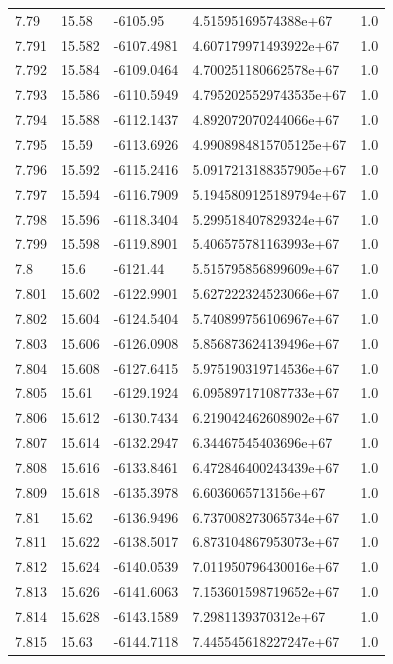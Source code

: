 \begin{tabular}{lllll}
7.79 & 15.58 & -6105.95 & 4.51595169574388e+67 & 1.0 \\
7.791 & 15.582 & -6107.4981 & 4.607179971493922e+67 & 1.0 \\
7.792 & 15.584 & -6109.0464 & 4.700251180662578e+67 & 1.0 \\
7.793 & 15.586 & -6110.5949 & 4.7952025529743535e+67 & 1.0 \\
7.794 & 15.588 & -6112.1437 & 4.892072070244066e+67 & 1.0 \\
7.795 & 15.59 & -6113.6926 & 4.9908984815705125e+67 & 1.0 \\
7.796 & 15.592 & -6115.2416 & 5.0917213188357905e+67 & 1.0 \\
7.797 & 15.594 & -6116.7909 & 5.1945809125189794e+67 & 1.0 \\
7.798 & 15.596 & -6118.3404 & 5.299518407829324e+67 & 1.0 \\
7.799 & 15.598 & -6119.8901 & 5.406575781163993e+67 & 1.0 \\
7.8 & 15.6 & -6121.44 & 5.515795856899609e+67 & 1.0 \\
7.801 & 15.602 & -6122.9901 & 5.627222324523066e+67 & 1.0 \\
7.802 & 15.604 & -6124.5404 & 5.740899756106967e+67 & 1.0 \\
7.803 & 15.606 & -6126.0908 & 5.856873624139496e+67 & 1.0 \\
7.804 & 15.608 & -6127.6415 & 5.975190319714536e+67 & 1.0 \\
7.805 & 15.61 & -6129.1924 & 6.095897171087733e+67 & 1.0 \\
7.806 & 15.612 & -6130.7434 & 6.219042462608902e+67 & 1.0 \\
7.807 & 15.614 & -6132.2947 & 6.34467545403696e+67 & 1.0 \\
7.808 & 15.616 & -6133.8461 & 6.472846400243439e+67 & 1.0 \\
7.809 & 15.618 & -6135.3978 & 6.6036065713156e+67 & 1.0 \\
7.81 & 15.62 & -6136.9496 & 6.737008273065734e+67 & 1.0 \\
7.811 & 15.622 & -6138.5017 & 6.873104867953073e+67 & 1.0 \\
7.812 & 15.624 & -6140.0539 & 7.011950796430016e+67 & 1.0 \\
7.813 & 15.626 & -6141.6063 & 7.153601598719652e+67 & 1.0 \\
7.814 & 15.628 & -6143.1589 & 7.2981139370312e+67 & 1.0 \\
7.815 & 15.63 & -6144.7118 & 7.445545618227247e+67 & 1.0 \\

\end{tabular}
